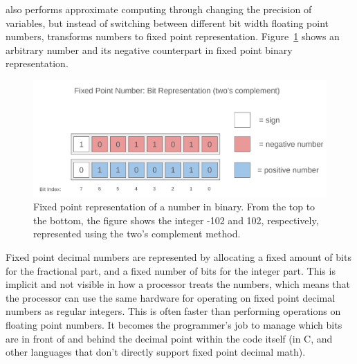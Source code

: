 \taffo{} also performs approximate computing through changing the precision of variables, but instead of switching between different bit width floating point numbers, \taffo{} transforms numbers to fixed point representation. Figure~\ref{fig:fixed_point_representation} shows an arbitrary number and its negative counterpart in fixed point binary representation.

\begin{figure}
    \centering
    \includegraphics[width=0.75\linewidth]{Images/fixed_point_bit_representation.png}
    \caption{Fixed point representation of a number in binary. From the top to the bottom, the figure shows the integer -102 and 102, respectively, represented using the two's complement method.}
    \label{fig:fixed_point_representation}
\end{figure}

Fixed point decimal numbers are represented by allocating a fixed amount of bits for the fractional part, and a fixed number of bits for the integer part. This is implicit and not visible in how a processor treats the numbers, which means that the processor can use the same hardware for operating on fixed point decimal numbers as regular integers. This is often faster than performing operations on floating point numbers. It becomes the programmer's job to manage which bits are in front of and behind the decimal point within the code itself (in C, and other languages that don't directly support fixed point decimal math). 


